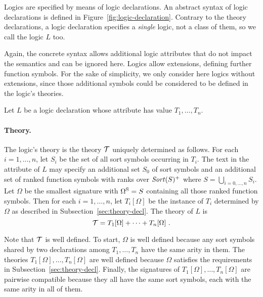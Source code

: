 Logics are specified by means of logic declarations.
An abstract syntax of logic declarations is defined in 
Figure~\ref{fig:logic-declaration}.
Contrary to the theory declarations, 
a logic declaration specifies a \emph{single} logic, 
not a class of them,
so we call the logic $L$ too.
\begin{newver}  
Again, the concrete syntax allows additional logic attributes
that do not impact the semantics and can be ignored here.
Logics allow extensions, defining further function symbols.
For the sake of simplicity, we only 
consider here logics without extensions, since those additional
symbols could be considered to be defined in the logic's theories.
\end{newver}

Let $L$ be a logic declaration whose  attribute has value
$T_1, \ldots, T_n$.

\paragraph{Theory.}
The logic's theory is the theory $\mathcal{T}$ uniquely determined as follows.
For each $i=1,\ldots,n$,
let $S_i$ be the set of all sort symbols occurring in $T_i$.
The text in the  attribute of $L$ may specify
an additional set $S_0$ of sort symbols and 
an additional set of ranked function symbols with ranks over $\mathit{Sort}(S)^+$
where $S = \bigcup_{i=0,\ldots,n} S_i$.
Let $\Omega$ be the smallest signature with $\Omega^\mathrm{S} = S$
containing all those ranked function symbols.
Then for each $i=1,\ldots,n$, 
let $T_i[\Omega]$ be the instance of $T_i$ determined by $\Omega$ 
as described in Subsection~\ref{sec:theory-decl}.
The theory of $L$ is 
\[
 \T = T_1[\Omega] + \cdots + T_n[\Omega]\ .
\]

Note that $\mathcal{T}$ is well defined.
To start, $\Omega$ is well defined 
because any sort symbols shared by two declarations among
$T_1, \ldots, T_n$ have the same arity in them.
The theories $T_1[\Omega], \ldots, T_n[\Omega]$ are well defined 
because $\Omega$ satisfies the requirements in Subsection~\ref{sec:theory-decl}.
Finally, 
the signatures of $T_1[\Omega], \ldots, T_n[\Omega]$ are pairwise compatible
because they all have the same sort symbols, 
each with the same arity in all of them.

 


